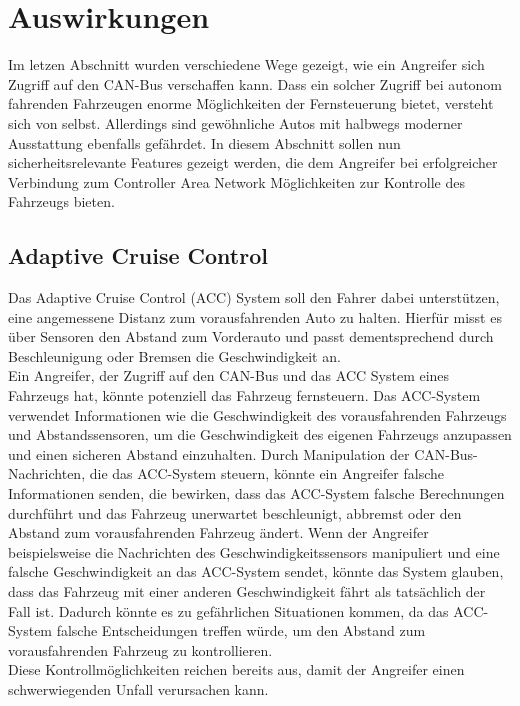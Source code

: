 \section{Auswirkungen}
Im letzen Abschnitt wurden verschiedene Wege gezeigt, wie ein Angreifer sich Zugriff auf den \acs{CAN}-Bus verschaffen kann. Dass ein solcher Zugriff bei autonom fahrenden Fahrzeugen enorme Möglichkeiten der Fernsteuerung bietet, versteht sich von selbst. Allerdings sind gewöhnliche Autos mit halbwegs moderner Ausstattung ebenfalls gefährdet. In diesem Abschnitt sollen nun sicherheitsrelevante Features gezeigt werden, die dem Angreifer bei erfolgreicher Verbindung zum Controller Area Network Möglichkeiten zur Kontrolle des Fahrzeugs bieten.


\subsection{Adaptive Cruise Control}
Das Adaptive Cruise Control (ACC) System soll den Fahrer dabei unterstützen, eine angemessene Distanz zum vorausfahrenden Auto zu halten. Hierfür misst es über Sensoren den Abstand zum Vorderauto und passt dementsprechend durch Beschleunigung oder Bremsen die Geschwindigkeit an. \\
Ein Angreifer, der Zugriff auf den \acs{CAN}-Bus und das \acs{ACC} System eines Fahrzeugs hat, könnte potenziell das Fahrzeug fernsteuern. Das ACC-System verwendet Informationen wie die Geschwindigkeit des vorausfahrenden Fahrzeugs und Abstandssensoren, um die Geschwindigkeit des eigenen Fahrzeugs anzupassen und einen sicheren Abstand einzuhalten. Durch Manipulation der \acs{CAN}-Bus-Nachrichten, die das \acs{ACC}-System steuern, könnte ein Angreifer falsche Informationen senden, die bewirken, dass das \acs{ACC}-System falsche Berechnungen durchführt und das Fahrzeug unerwartet beschleunigt, abbremst oder den Abstand zum vorausfahrenden Fahrzeug ändert.
Wenn der Angreifer beispielsweise die Nachrichten des Geschwindigkeitssensors manipuliert und eine falsche Geschwindigkeit an das \acs{ACC}-System sendet, könnte das System glauben, dass das Fahrzeug mit einer anderen Geschwindigkeit fährt als tatsächlich der Fall ist. Dadurch könnte es zu gefährlichen Situationen kommen, da das \acs{ACC}-System falsche Entscheidungen treffen würde, um den Abstand zum vorausfahrenden Fahrzeug zu kontrollieren.\\
Diese Kontrollmöglichkeiten reichen bereits aus, damit der Angreifer einen schwerwiegenden Unfall verursachen kann.

